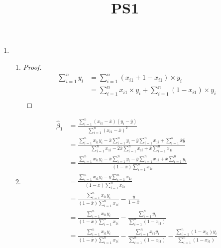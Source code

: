 \documentclass{article}
\title{PS1}
\begin{document}
\maketitle
\begin{enumerate}
    \item \begin{enumerate}
        \item \begin{proof}
            \begin{equation}
                \begin{aligned}
                    \sum_{i=1}^{n}y_i
                    &=\sum_{i=1}^{n}(x_{i1}+1-x_{i1})\times y_i \\
                    &=\sum_{i=1}^{n}x_{i1}\times y_i+\sum_{i=1}^{n}(1-x_{i1})\times y_i \\
                \end{aligned}
                \nonumber
            \end{equation}
        \end{proof}
        \item \begin{equation}
            \begin{aligned}
                \hat{\beta}_1
                &=\frac{\sum_{i=1}^{n}(x_{i1}-\overline{x})(y_i-\overline{y})}{\sum_{i=1}^{n}(x_{i1}-\overline{x})^2} \\
                &=\frac{\sum_{i=1}^{n}x_{i1}y_i-\overline{x}\sum_{i=1}^{n}y_i-\overline{y}\sum_{i=1}^{n}x_{1i}+\sum_{i=1}^{n}\overline{x}\overline{y}}{\sum_{i=1}^{n}x_{1i}-2\overline{x}\sum_{i=1}^{n}x_{1i}+\overline{x}\sum_{i=1}^{n}x_{1i}} \\
                &=\frac{\sum_{i=1}^{n}x_{i1}y_i-\overline{x}\sum_{i=1}^{n}y_i-\overline{y}\sum_{i=1}^{n}x_{1i}+\overline{x}\sum_{i=1}^{n}y_i}{(1-\overline{x})\sum_{i=1}^{n}x_{1i}} \\
                &=\frac{\sum_{i=1}^{n}x_{i1}y_i-\overline{y}\sum_{i=1}^{n}x_{1i}}{(1-\overline{x})\sum_{i=1}^{n}x_{1i}} \\
                &=\frac{\sum_{i=1}^{n}x_{i1}y_i}{(1-\overline{x})\sum_{i=1}^{n}x_{1i}}-\frac{\overline{y}}{1-\overline{x}} \\
                &=\frac{\sum_{i=1}^{n}x_{i1}y_i}{(1-\overline{x})\sum_{i=1}^{n}x_{1i}}-\frac{\sum_{i=1}^{n}y_i}{\sum_{i=1}^{n}(1-x_{i1})} \\
                &=\frac{\sum_{i=1}^{n}x_{i1}y_i}{(1-\overline{x})\sum_{i=1}^{n}x_{1i}}-\frac{\sum_{i=1}^{n}x_{i1}y_i}{\sum_{i=1}^{n}(1-x_{i1})}-\frac{\sum_{i=1}^{n}(1-x_{i1})y_i}{\sum_{i=1}^{n}(1-x_{i1})} \\

\end{aligned}
\end{equation}
\end{enumerate}
\end{enumerate}
\end{document}
